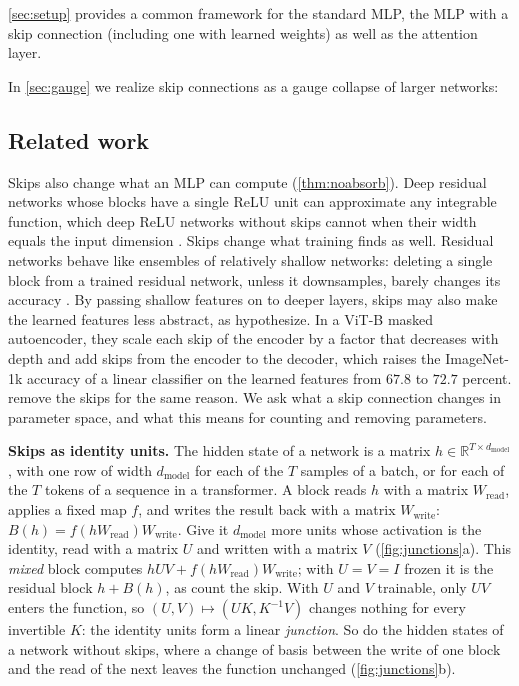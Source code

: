 \documentclass[10pt]{article}
\theoremstyle{definition}
\theoremstyle{remark}
\newcommand{\R}{\mathbb{R}}
\newcommand{\Wread}{W_{\mathrm{read}}}
\newcommand{\Wwrite}{W_{\mathrm{write}}}
\newcommand{\dm}{d_{\mathrm{model}}}
\newcommand{\para}[1]{\smallskip\noindent\textbf{#1}\hspace{0.5em}}
\begin{document}
\ref{sec:setup} provides a common framework for the standard MLP, the MLP with a skip connection (including one with learned weights) as well as the attention layer.

In \ref{sec:gauge} we realize skip connections as a gauge collapse of larger networks: 


\subsection{Related work}


Skips also change what an MLP can compute (\cref{thm:noabsorb}). Deep residual networks whose blocks have a single ReLU unit can approximate any integrable function, which deep ReLU networks without skips cannot when their width equals the input dimension \citep{lin2018resnet}. Skips change what training finds as well. Residual networks behave like ensembles of relatively shallow networks: deleting a single block from a trained residual network, unless it downsamples, barely changes its accuracy \citep{veit2016ensembles}. By passing shallow features on to deeper layers, skips may also make the learned features less abstract, as \citet{zhang2026residual} hypothesize. In a ViT-B masked autoencoder, they scale each skip of the encoder by a factor that decreases with depth and add skips from the encoder to the decoder, which raises the ImageNet-1k accuracy of a linear classifier on the learned features from $67.8$ to $72.7$ percent. \citet{ji2026cutting} remove the skips for the same reason. We ask what a skip connection changes in parameter space, and what this means for counting and removing parameters.

\para{Skips as identity units.} The hidden state of a network is a matrix $h \in \R^{T\times\dm}$, with one row of width $\dm$ for each of the $T$ samples of a batch, or for each of the $T$ tokens of a sequence in a transformer. A block reads $h$ with a matrix $\Wread$, applies a fixed map $f$, and writes the result back with a matrix $\Wwrite$: $B(h) = f(h\Wread)\Wwrite$. Give it $\dm$ more units whose activation is the identity, read with a matrix $U$ and written with a matrix $V$ (\cref{fig:junctions}a). This \emph{mixed} block computes $hUV + f(h\Wread)\Wwrite$; with $U = V = I$ frozen it is the residual block $h + B(h)$, as \citet{lin2018resnet} count the skip. With $U$ and $V$ trainable, only $UV$ enters the function, so $(U, V) \mapsto (UK, K^{-1}V)$ changes nothing for every invertible $K$: the identity units form a linear \emph{junction}. So do the hidden states of a network without skips, where a change of basis between the write of one block and the read of the next leaves the function unchanged (\cref{fig:junctions}b).
\end{document}
